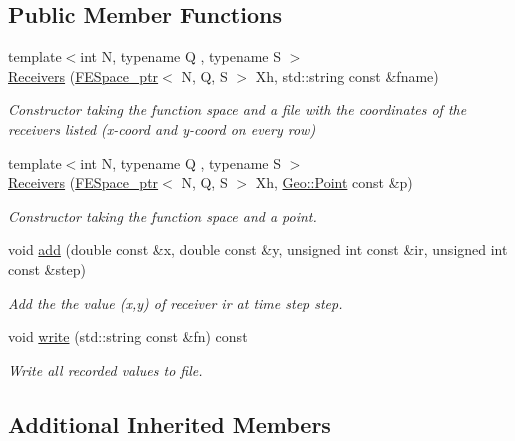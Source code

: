 \subsection*{Public Member Functions}
\begin{DoxyCompactItemize}
\item 
{\footnotesize template$<$int N, typename Q , typename S $>$ }\\\hyperlink{classTspeed_1_1Receivers_aa2d2be2926bc58e831056b45333e9ea5}{Receivers} (\hyperlink{namespaceTspeed_a05fcb57094666c8f5ab1e90d1a6fecf8}{F\-E\-Space\-\_\-ptr}$<$ N, Q, S $>$ Xh, std\-::string const \&fname)
\begin{DoxyCompactList}\small\item\em Constructor taking the function space and a file with the coordinates of the receivers listed (x-\/coord and y-\/coord on every row) \end{DoxyCompactList}\item 
{\footnotesize template$<$int N, typename Q , typename S $>$ }\\\hyperlink{classTspeed_1_1Receivers_acb78a593a31d22d41c7e7b4fcde3136b}{Receivers} (\hyperlink{namespaceTspeed_a05fcb57094666c8f5ab1e90d1a6fecf8}{F\-E\-Space\-\_\-ptr}$<$ N, Q, S $>$ Xh, \hyperlink{classTspeed_1_1Geo_1_1Point}{Geo\-::\-Point} const \&p)
\begin{DoxyCompactList}\small\item\em Constructor taking the function space and a point. \end{DoxyCompactList}\item 
void \hyperlink{classTspeed_1_1Receivers_a15b123b2f6b8128fb2d13daed8445161}{add} (double const \&x, double const \&y, unsigned int const \&ir, unsigned int const \&step)
\begin{DoxyCompactList}\small\item\em Add the the value (x,y) of receiver ir at time step step. \end{DoxyCompactList}\item 
void \hyperlink{classTspeed_1_1Receivers_ad32bdb06e006424a3d5dfef270d01b50}{write} (std\-::string const \&fn) const 
\begin{DoxyCompactList}\small\item\em Write all recorded values to file. \end{DoxyCompactList}\end{DoxyCompactItemize}
\subsection*{Additional Inherited Members}


